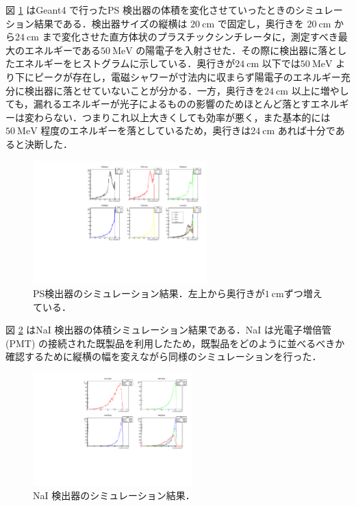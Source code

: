 図 \ref{PS_sim} はGeant4 で行ったPS 検出器の体積を変化させていったときのシミュレーション結果である．検出器サイズの縦横は $20~\mathrm{cm}$ で固定し，奥行きを $20~\mathrm{cm}$ から$24~\mathrm{cm}$ まで変化させた直方体状のプラスチックシンチレータに，測定すべき最大のエネルギーである$50~\mathrm{MeV}$ の陽電子を入射させた．その際に検出器に落としたエネルギーをヒストグラムに示している．奥行きが$24~\mathrm{cm}$ 以下では$50~\mathrm{MeV}$ より下にピークが存在し，電磁シャワーが寸法内に収まらず陽電子のエネルギー充分に検出器に落とせていないことが分かる．一方，奥行きを$24~\mathrm{cm}$ 以上に増やしても，漏れるエネルギーが光子によるものの影響のためほとんど落とすエネルギーは変わらない．つまりこれ以上大きくしても効率が悪く，また基本的には$50~\mathrm{MeV}$ 程度のエネルギーを落としているため，奥行きは$24~\mathrm{cm}$ あれば十分であると決断した．
\begin{figure}[H]
\centering
\includegraphics[width=0.6\textwidth,angle=-90]{figure/hayakawa/pl_20_24.pdf}
\caption{PS検出器のシミュレーション結果．左上から奥行きが$1~\mathrm{cm}$ずつ増えている． }
\label{PS_sim}
\end{figure}

図 \ref{NaI_sim} はNaI 検出器の体積シミュレーション結果である．NaI は光電子増倍管 (PMT) の接続された既製品を利用したため，既製品をどのように並べるべきか確認するために縦横の幅を変えながら同様のシミュレーションを行った．

\begin{figure}[H]
\centering
\includegraphics[width=0.55\textwidth,angle=-90]{figure/hayakawa/NaI_10_20.pdf}
\caption{NaI 検出器のシミュレーション結果．}
\label{NaI_sim}
\end{figure}

